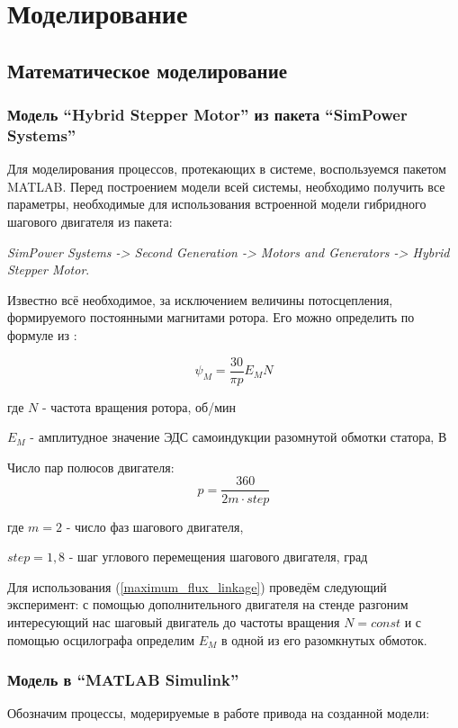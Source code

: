 \newpage
\section{Моделирование}

\subsection{Математическое моделирование}

\subsubsection{Модель ``Hybrid Stepper Motor'' из пакета ``SimPower Systems''}

Для моделирования процессов, протекающих в системе, воспользуемся пакетом MATLAB.
Перед построением модели всей системы, необходимо получить все параметры,
необходимые для использования встроенной модели гибридного шагового двигателя из пакета:

\textit{SimPower Systems -> Second Generation -> Motors and Generators -> Hybrid Stepper Motor}.

Известно всё необходимое, за исключением величины потосцепления, формируемого
постоянными магнитами ротора. Его можно определить по формуле
из \cite{Matlab_help_stepper_motor}:

\begin{equation}
    \label{maximum_flux_linkage}
    \psi_{M} = \frac{30}{\pi p} E_{M} N
\end{equation}

где $N$ - частота вращения ротора, об/мин

$E_{M}$ - амплитудное значение ЭДС самоиндукции разомнутой обмотки статора, В

Число пар полюсов двигателя:
$$
p = \frac{360}{2m \cdot step}
$$

где $m = 2$ - число фаз шагового двигателя,

$step = 1,8$ - шаг углового перемещения шагового двигателя, град

Для использования (\ref{maximum_flux_linkage}) проведём следующий эксперимент:
с помощью дополнительного двигателя на стенде разгоним интересующий нас шаговый
двигатель до частоты вращения $N = const$ и с помощью осцилографа определим $E_{M}$
в одной из его разомкнутых обмоток.

\subsubsection{Модель в ``MATLAB Simulink''}
Обозначим процессы, модерируемые в работе привода на созданной модели:

